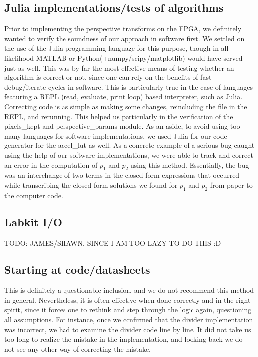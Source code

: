 \documentclass{article}
\begin{document}
\subsection{Julia implementations/tests of algorithms}
Prior to implementing the perspective transforms on the FPGA,
we definitely wanted to verify the soundness of our approach in software first.
We settled on the use of the Julia programming language for this purpose,
though in all likelihood MATLAB or Python(+numpy/scipy/matplotlib) would have served just as well.
This was by far the most effective means of testing whether an algorithm is correct or not,
since one can rely on the benefits of fast debug/iterate cycles in software.
This is particularly true in the case of languages featuring a REPL (read, evaluate, print loop) based interpreter, such as Julia.
Correcting code is as simple as making some changes, reincluding the file in the REPL, and rerunning.
This helped us particularly in the verification of the pixels\_kept and perspective\_params module.
As an aside, to avoid using too many languages for software implementations,
we used Julia for our code generator for the accel\_lut as well.
As a concrete example of a serious bug caught using the help of our software implementations,
we were able to track and correct an error in the computation of $p_1$ and $p_2$ using this method.
Essentially, the bug was an interchange of two terms in the closed form expressions that occurred
while transcribing the closed form solutions we found for $p_1$ and $p_2$ from paper to the computer code.

\subsection{Labkit I/O}
TODO: JAMES/SHAWN, SINCE I AM TOO LAZY TO DO THIS :D

\subsection{Starting at code/datasheets}
This is definitely a questionable inclusion, and we do not recommend this method in general.
Nevertheless, it is often effective when done correctly and in the right spirit,
since it forces one to rethink and step through the logic again, questioning all assumptions.
For instance, once we confirmed that the divider implementation was incorrect,
we had to examine the divider code line by line.
It did not take us too long to realize the mistake in the implementation,
and looking back we do not see any other way of correcting the mistake.
\end{document}
